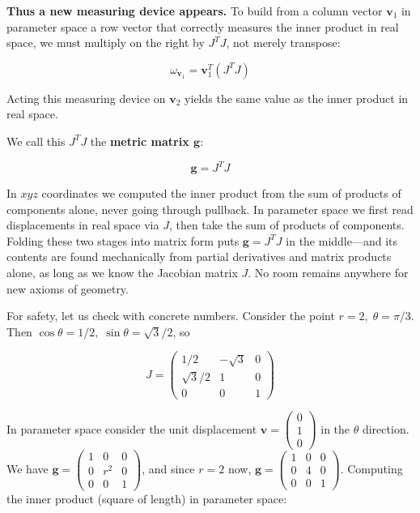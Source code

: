 \textbf{Thus a new measuring device appears.} To build from a column
vector \(\mathbf{v}_1\) in parameter space a row vector that correctly
measures the inner product in real space, we must multiply on the right
by \(J^T J\), not merely transpose:

\[\omega_{\mathbf{v}_1} = \mathbf{v}_1^T (J^T J)\]

Acting this measuring device on \(\mathbf{v}_2\) yields the same value
as the inner product in real space.

We call this \(J^T J\) the \textbf{metric matrix $\mathbf{g}$}:

\[\mathbf{g} = J^T J\]

In \(xyz\) coordinates we computed the inner product from the sum of
products of components alone, never going through pullback. In parameter
space we first read displacements in real space via \(J\), then take the
sum of products of components. Folding these two stages into matrix form
puts \(\mathbf{g}=J^T J\) in the middle---and its contents are found
mechanically from partial derivatives and matrix products alone, as long
as we know the Jacobian matrix \(J\). No room remains anywhere for new
axioms of geometry.

For safety, let us check with concrete numbers. Consider the point
\(r=2,\; \theta=\pi/3\). Then
\(\cos\theta = 1/2,\; \sin\theta = \sqrt{3}/2\), so

\[J = \begin{pmatrix}
1/2 & -\sqrt{3} & 0 \\
\sqrt{3}/2 & 1 & 0 \\
0 & 0 & 1
\end{pmatrix}\]

In parameter space consider the unit displacement
\(\mathbf{v} = \begin{pmatrix}0 \\ 1 \\ 0\end{pmatrix}\) in the
\(\theta\) direction. We have
\(\mathbf{g} = \begin{pmatrix} 1 & 0 & 0 \\ 0 & r^2 & 0 \\ 0 & 0 & 1 \end{pmatrix}\),
and since \(r=2\) now,
\(\mathbf{g} = \begin{pmatrix} 1 & 0 & 0 \\ 0 & 4 & 0 \\ 0 & 0 & 1 \end{pmatrix}\).
Computing the inner product (square of length) in parameter space:

